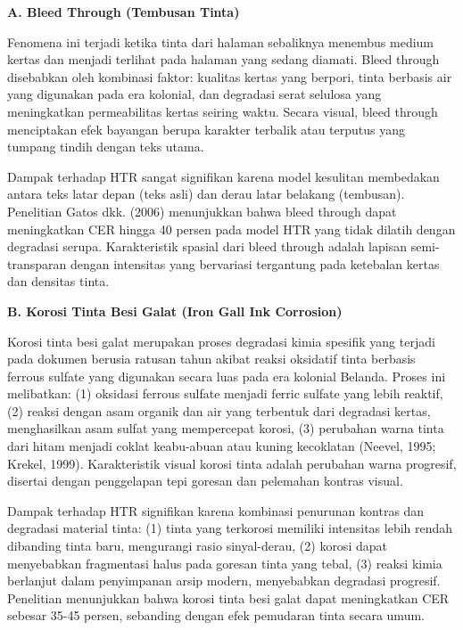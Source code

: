 \documentclass[12pt,a4paper]{book}
\begin{document}
\vspace{0.5ex}
\vspace{0.5ex}
\noindent\textbf{A. Bleed Through (Tembusan Tinta)}

Fenomena ini terjadi ketika tinta dari halaman sebaliknya menembus medium kertas dan menjadi terlihat pada halaman yang sedang diamati. Bleed through disebabkan oleh kombinasi faktor: kualitas kertas yang berpori, tinta berbasis air yang digunakan pada era kolonial, dan degradasi serat selulosa yang meningkatkan permeabilitas kertas seiring waktu. Secara visual, bleed through menciptakan efek bayangan berupa karakter terbalik atau terputus yang tumpang tindih dengan teks utama.

Dampak terhadap HTR sangat signifikan karena model kesulitan membedakan antara teks latar depan (teks asli) dan derau latar belakang (tembusan). Penelitian Gatos dkk. (2006) menunjukkan bahwa bleed through dapat meningkatkan CER hingga 40 persen pada model HTR yang tidak dilatih dengan degradasi serupa. Karakteristik spasial dari bleed through adalah lapisan semi-transparan dengan intensitas yang bervariasi tergantung pada ketebalan kertas dan densitas tinta.

\vspace{0.5ex}
\noindent\textbf{B. Korosi Tinta Besi Galat (Iron Gall Ink Corrosion)}

Korosi tinta besi galat merupakan proses degradasi kimia spesifik yang terjadi pada dokumen berusia ratusan tahun akibat reaksi oksidatif tinta berbasis ferrous sulfate yang digunakan secara luas pada era kolonial Belanda. Proses ini melibatkan: (1) oksidasi ferrous sulfate menjadi ferric sulfate yang lebih reaktif, (2) reaksi dengan asam organik dan air yang terbentuk dari degradasi kertas, menghasilkan asam sulfat yang mempercepat korosi, (3) perubahan warna tinta dari hitam menjadi coklat keabu-abuan atau kuning kecoklatan (Neevel, 1995; Krekel, 1999). Karakteristik visual korosi tinta adalah perubahan warna progresif, disertai dengan penggelapan tepi goresan dan pelemahan kontras visual.

Dampak terhadap HTR signifikan karena kombinasi penurunan kontras dan degradasi material tinta: (1) tinta yang terkorosi memiliki intensitas lebih rendah dibanding tinta baru, mengurangi rasio sinyal-derau, (2) korosi dapat menyebabkan fragmentasi halus pada goresan tinta yang tebal, (3) reaksi kimia berlanjut dalam penyimpanan arsip modern, menyebabkan degradasi progresif. Penelitian menunjukkan bahwa korosi tinta besi galat dapat meningkatkan CER sebesar 35-45 persen, sebanding dengan efek pemudaran tinta secara umum.
\end{document}

